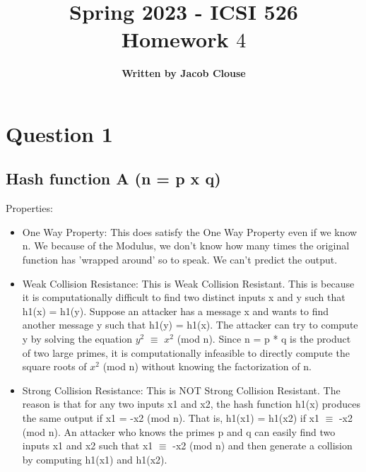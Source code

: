 \documentclass[10pt]{article}
\author{\vspace{0.2in}\textbf{Written by Jacob Clouse}}
\title{Spring 2023 - ICSI 526\\Homework $4$}
\begin{document}
\maketitle
\tableofcontents
\vspace{0.2in}

\section{Question 1}
\subsection{Hash function A (n = p x q)}
\noindent Properties: 
\begin{itemize}
	\item One Way Property: This does satisfy the One Way Property even if we know n. We because of the Modulus, we don't know how many times the original function has 'wrapped around' so to speak. We can't predict the output.
	
	
	\item Weak Collision Resistance: This is Weak Collision Resistant. This is because it is computationally difficult to find two distinct inputs x and y such that h1(x) = h1(y). Suppose an attacker has a message x and wants to find another message y such that h1(y) = h1(x). The attacker can try to compute y by solving the equation $y^2$ $\equiv$ $x^2$ (mod n). Since n = p * q is the product of two large primes, it is computationally infeasible to directly compute the square roots of $x^2$ (mod n) without knowing the factorization of n.
	
	
	\item Strong Collision Resistance: This is NOT Strong Collision Resistant. The reason is that for any two inputs x1 and x2, the hash function h1(x) produces the same output if x1 = -x2 (mod n). That is, h1(x1) = h1(x2) if x1 $\equiv$ -x2 (mod n). 
	An attacker who knows the primes p and q can easily find two inputs x1 and x2 such that x1 $\equiv$ -x2 (mod n) and then generate a collision by computing h1(x1) and h1(x2). 
	
\end{itemize}

\vspace{0.2in}
\end{document}
